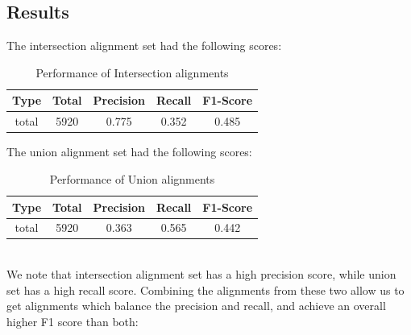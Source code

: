 \documentclass{article}
\begin{document}
	\subsection{Results}
		The intersection alignment set had the following scores:
		\begin{table}[htbp]
			\center
			\begin{tabular}{|c|c|c|c|c|}
				\hline
				Type&Total&Precision&Recall&F1-Score\\
				\hline
				total&        5920&     0.775&        0.352&        0.485\\
				\hline
			\end{tabular}
			\caption{Performance of Intersection alignments}
		\end{table}

		The union alignment set had the following scores:
		\begin{table}[htbp]
			\center
			\begin{tabular}{|c|c|c|c|c|}
				\hline
				Type&Total&Precision&Recall&F1-Score\\
				\hline
				total&5920&0.363&0.565&0.442\\
				\hline
			\end{tabular}
			\caption{Performance of Union alignments}
		\end{table}
		\\We note that intersection alignment set has a high precision score, while union set has a high recall score. Combining the alignments from these two allow us to get alignments which balance the precision and recall, and achieve an overall higher F1 score than both:
\end{document}
